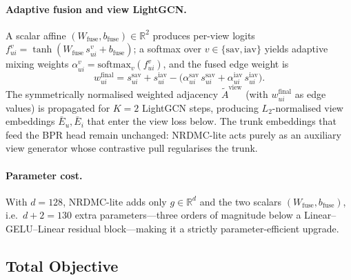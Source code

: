 \documentclass[conference]{IEEEtran}
\begin{document}
\paragraph{Adaptive fusion and view LightGCN.} A scalar affine
$(W_{\text{fuse}}, b_{\text{fuse}}) \in \mathbb{R}^{2}$ produces
per-view logits
$f^{v}_{ui} = \tanh(W_{\text{fuse}}\, s^{v}_{ui} + b_{\text{fuse}})$;
a softmax over $v\in\{\text{sav},\text{iav}\}$ yields adaptive mixing
weights $\alpha^{v}_{ui} = \mathrm{softmax}_{v}(f^{v}_{ui})$, and the
fused edge weight is
\begin{equation}
w^{\text{final}}_{ui} = s^{\text{sav}}_{ui} + s^{\text{iav}}_{ui}
    - \big(\alpha^{\text{sav}}_{ui}\, s^{\text{sav}}_{ui}
       + \alpha^{\text{iav}}_{ui}\, s^{\text{iav}}_{ui}\big).
\label{eq:fuse}
\end{equation}
The symmetrically normalised weighted adjacency $\tilde A^{\text{view}}$
(with $w^{\text{final}}_{ui}$ as edge values) is propagated for
$K{=}2$ LightGCN steps, producing $L_2$-normalised view embeddings
$\bar E_u, \bar E_i$ that enter the view loss below. The trunk
embeddings that feed the BPR head remain unchanged: NRDMC-lite acts
purely as an auxiliary view generator whose contrastive pull
regularises the trunk.

\paragraph{Parameter cost.} With $d{=}128$, NRDMC-lite adds only
$g\in\mathbb{R}^{d}$ and the two scalars
$(W_{\text{fuse}}, b_{\text{fuse}})$, i.e.\ $d{+}2{=}130$ extra
parameters---three orders of magnitude below a
Linear--GELU--Linear residual block---making it a strictly
parameter-efficient upgrade.

\subsection{Total Objective}
\label{sec:totalloss}
\end{document}
